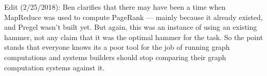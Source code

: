\documentclass[a4paper,12pt,notitlepage,twoside,openright]{article}
\begin{document}
Edit (2/25/2018): Ben clarifies that there may have been a time when
MapReduce was used to compute PageRank --- mainly because it already
existed, and Pregel wasn't built yet. But again, this was an instance of
using an existing hammer, not any claim that it was the optimal hammer
for the task. So the point stands that everyone knows its a poor tool
for the job of running graph computations and systems builders should
stop comparing their graph computation systems against it.

\enlargethispage{3\baselineskip}
\theendnotes{}
\end{document}
